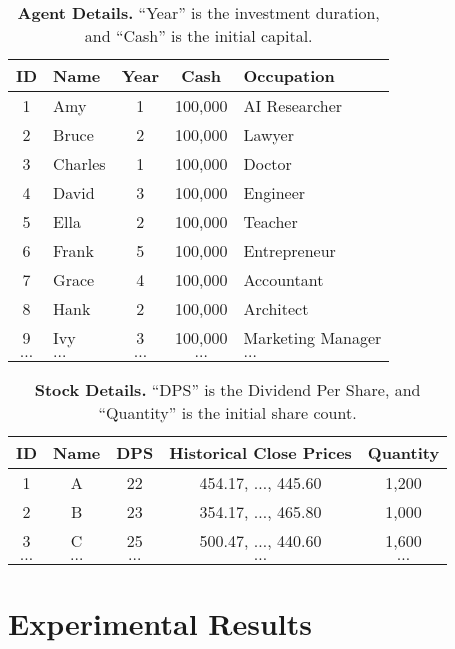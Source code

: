 
\begin{table}
	\centering
	\footnotesize
	\setlength{\tabcolsep}{6pt}
	\begin{tabular}{clccl} 
	\toprule[1.1pt]
	ID & Name & Year & Cash & Occupation \\
	\midrule
	1 & Amy & 1 & 100,000 & AI Researcher \\
	2 & Bruce & 2 & 100,000 & Lawyer \\
	3 & Charles & 1 & 100,000 & Doctor \\
	4 & David & 3 & 100,000 & Engineer \\
	5 & Ella & 2 & 100,000 & Teacher \\
	6 & Frank & 5 & 100,000 & Entrepreneur \\
	7 & Grace & 4 & 100,000 & Accountant \\
	8 & Hank & 2 & 100,000 & Architect \\
	9 & Ivy & 3 & 100,000 & Marketing Manager \\
	$\dots$ & $\dots$ & $\dots$ & $\dots$ & $\dots$\\
	\bottomrule[1.1pt]
	\end{tabular}
	\caption{\textbf{Agent Details.} ``Year'' is the investment duration, and ``Cash'' is the initial capital.} 
	\label{table_person}
	\vspace{-3pt}
\end{table}

\begin{table}
	\centering 
	\footnotesize
	\setlength{\tabcolsep}{5pt}
	\begin{tabular}{ccccc} 
	\toprule[1.1pt] 
	ID & Name & DPS & Historical Close Prices & Quantity \\ 
	\midrule
	1 & A & 22 & 454.17, $\dots$, 445.60 & 1,200 \\
	2 & B & 23 & 354.17, $\dots$, 465.80 & 1,000 \\
	3 & C & 25 & 500.47, $\dots$, 440.60 & 1,600 \\
	$\dots$ & $\dots$ & $\dots$ & $\dots$ & $\dots$\\
	\bottomrule[1.1pt]
	\end{tabular}
	\caption{\textbf{Stock Details.} ``DPS'' is the Dividend Per Share, and ``Quantity'' is the initial share count.} 
	\label{stock}
	\vspace{-3pt}
\end{table}

\section{Experimental Results}

